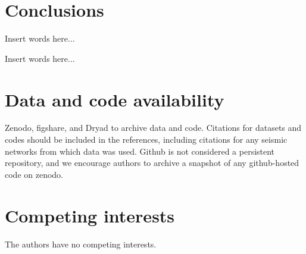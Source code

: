 \documentclass[preprint]{seismica}
\begin{document}
\section{Conclusions} \label{sec:conclusion}

    Insert words here...

\begin{acknowledgements}
    [Suzan] Insert words here...
\end{acknowledgements}

\section*{Data and code availability}
Zenodo, figshare, and Dryad to archive data and code. Citations for datasets and codes should be
included in the references, including citations for any seismic networks from which data was used.
Github is not considered a persistent repository, and we encourage authors to archive a snapshot of
any github-hosted code on zenodo.

\section*{Competing interests}
    The authors have no competing interests.


   
\end{document}
